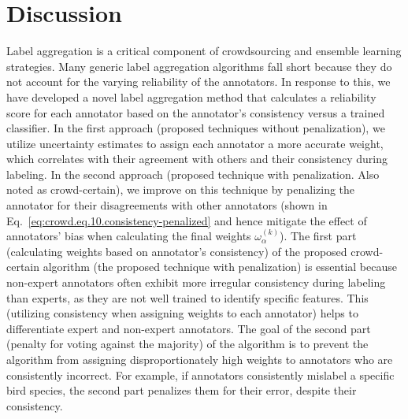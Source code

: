 
\section{Discussion}\label{sec:crowd.discussion}
Label aggregation is a critical component of crowdsourcing and ensemble learning strategies. Many generic label aggregation algorithms fall short because they do not account for the varying reliability of the annotators. In response to this, we have developed a novel label aggregation method that calculates a reliability score for each annotator based on the annotator’s consistency versus a trained classifier. In the first approach (proposed techniques without penalization), we utilize uncertainty estimates to assign each annotator a more accurate weight, which correlates with their agreement with others and their consistency during labeling. In the second approach (proposed technique with penalization. Also noted as crowd-certain), we improve  on this technique by penalizing the annotator for their disagreements with other annotators (shown in Eq.~\ref{eq:crowd.eq.10.consistency-penalized} and hence mitigate the effect of annotators’ bias when calculating the final weights $\omega_{\alpha}^{(k)}$).
The first part (calculating weights based on annotator’s consistency) of the proposed crowd-certain algorithm (the proposed technique with penalization) is essential because non-expert annotators often exhibit more irregular consistency during labeling than experts, as they are not well trained to identify specific features. This (utilizing consistency when assigning weights to each annotator) helps to differentiate expert and non-expert annotators. The goal of the second part (penalty for voting against the majority) of the algorithm is to prevent the algorithm from assigning disproportionately high weights to annotators who are consistently incorrect. For example, if annotators consistently mislabel a specific bird species, the second part penalizes them for their error, despite their consistency.
